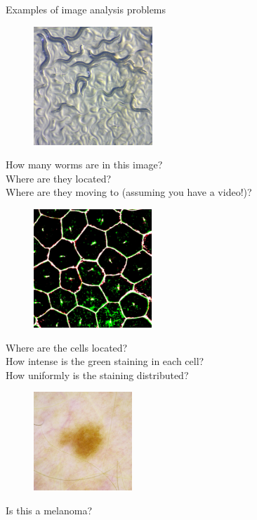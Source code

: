 \documentclass[9pt, aspectratio=169]{beamer}
\begin{document}
\begin{frame}
    {Examples of image analysis problems}
    {
        \begin{figure}
            \includegraphics[height=12em]{c elegans - Zeiss - CC-BY 2.0.jpg}
            \caption{\color{gray}{Zeiss - CC-BY 2.0}}
        \end{figure}
        \centering
        How many worms are in this image?\\
        Where are they located?\\
        Where are they moving to (assuming you have a video!)?
    }
    {
        \begin{figure}
            \includegraphics[height=12em]{Retinal pigment epithelium - NIH - CC BY-NC 2.0.jpg}
            \caption{\color{gray}{NIH - CC-BY-SA 2.0}}
        \end{figure}
        \centering
        Where are the cells located?\\
        How intense is the green staining in each cell?\\
        How uniformly is the staining distributed?
    }
    {
        \begin{figure}
            \includegraphics[height=10em]{ISIC melanoma competition - CC0.png}
            \caption{\color{gray}{ISIC melanoma competition - CC-0}}
        \end{figure}
        \centering
        Is this a melanoma?
    }
\end{frame}
\end{document}
